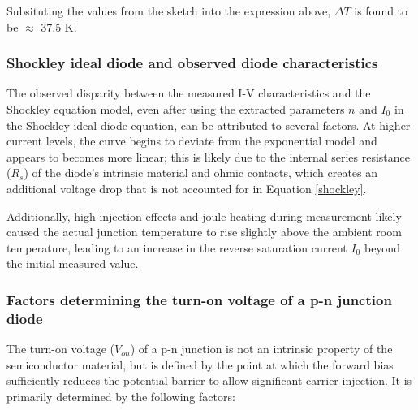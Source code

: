 \documentclass[1pt]{article}
\begin{document}
Subsituting the values from the sketch into the expression above, $\Delta T$ is found to be $\approx$ 37.5 K. 


\subsubsection{Shockley ideal diode and observed diode characteristics}

The observed disparity between the measured I-V characteristics and the Shockley equation model, even after using the extracted parameters $n$ and $I_0$ in the Shockley ideal diode equation, can be attributed to several factors. At higher current levels, the curve begins to deviate from the exponential model and appears to becomes more linear; this is likely due to the internal series resistance ($R_s$) of the diode's intrinsic material and ohmic contacts, which creates an additional voltage drop that is not accounted for in Equation \ref{shockley}. 

Additionally, high-injection effects and joule heating during measurement likely caused the actual junction temperature to rise slightly above the ambient room temperature, leading to an increase in the reverse saturation current $I_0$ beyond the initial measured value.


\subsubsection{Factors determining the turn-on voltage of a p-n junction diode}

The turn-on voltage ($V_{on}$) of a p-n junction is not an intrinsic property of the semiconductor material, but is defined by the point at which the forward bias sufficiently reduces the potential barrier to allow significant carrier injection. It is primarily determined by the following factors:
\end{document}
